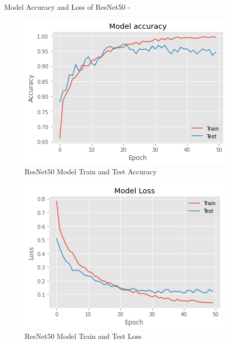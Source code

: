 \newpage
\vspace{5mm}
Model Accuracy and Loss of ResNet50 -
\vspace{5mm}
\begin{figure}[hbt!]
\centering
\includegraphics[scale=1]{images/fig-29.png}
\caption{ResNet50 Model Train and Test Accuracy}
\label{fig:x ResNet50 Model Train and Test Accuracy}
\end{figure}

\vspace{5mm}
\begin{figure}[hbt!]
\centering
\includegraphics[scale=1]{images/fig-30.png}
\caption{ResNet50 Model Train and Test Loss}
\label{fig:x ResNet50 Model Train and Test Loss}
\end{figure}

